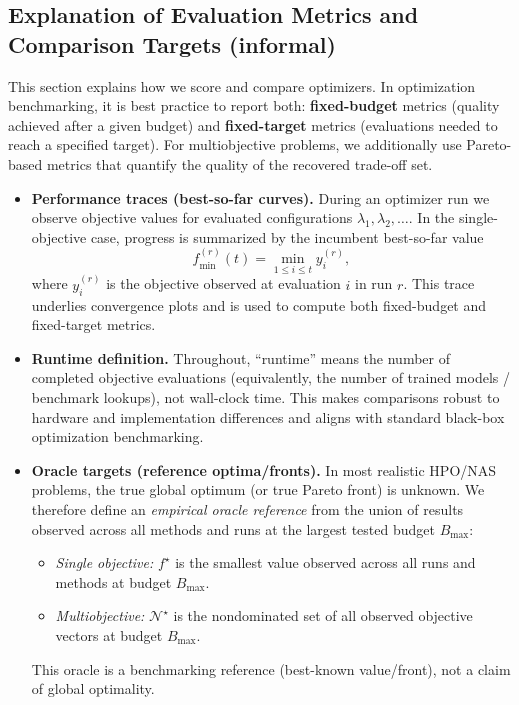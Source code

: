 \subsection*{Explanation of Evaluation Metrics and Comparison Targets (informal)}
This section explains how we score and compare optimizers.
In optimization benchmarking, it is best practice to report both:
\textbf{fixed-budget} metrics (quality achieved after a given budget) and
\textbf{fixed-target} metrics (evaluations needed to reach a specified target).
For multiobjective problems, we additionally use Pareto-based metrics that quantify the quality of the recovered trade-off set.

\begin{itemize}
    \item \textbf{Performance traces (best-so-far curves).}
    During an optimizer run we observe objective values for evaluated configurations \(\lambda_1,\lambda_2,\ldots\).
    In the single-objective case, progress is summarized by the incumbent best-so-far value
    \[
        f_{\min}^{(r)}(t) = \min_{1 \le i \le t} y_i^{(r)},
    \]
    where \(y_i^{(r)}\) is the objective observed at evaluation \(i\) in run \(r\).
    This trace underlies convergence plots and is used to compute both fixed-budget and fixed-target metrics.

    \item \textbf{Runtime definition.}
    Throughout, ``runtime'' means the number of completed objective evaluations
    (equivalently, the number of trained models / benchmark lookups), not wall-clock time.
    This makes comparisons robust to hardware and implementation differences and aligns with standard black-box optimization benchmarking.

    \item \textbf{Oracle targets (reference optima/fronts).}
    In most realistic HPO/NAS problems, the true global optimum (or true Pareto front) is unknown.
    We therefore define an \emph{empirical oracle reference} from the union of results observed across all methods and runs
    at the largest tested budget \(B_{\max}\):
    \begin{itemize}
        \item \emph{Single objective:} \(f^\star\) is the smallest value observed across all runs and methods at budget \(B_{\max}\).
        \item \emph{Multiobjective:} \(\mathcal{N}^\star\) is the nondominated set of all observed objective vectors at budget \(B_{\max}\).
    \end{itemize}
    This oracle is a benchmarking reference (best-known value/front), not a claim of global optimality.


\end{itemize}
